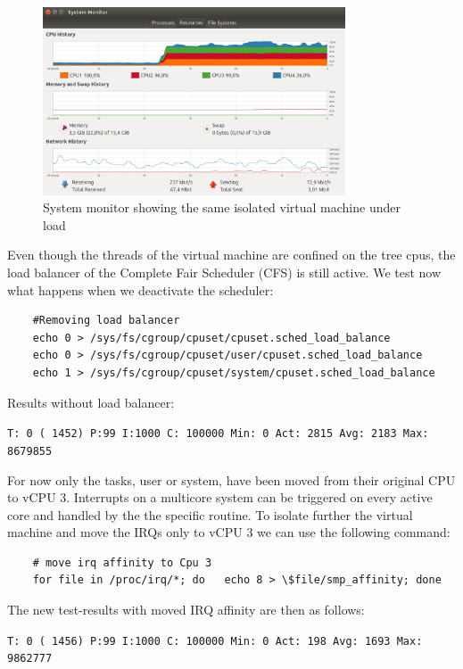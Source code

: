 \documentclass[]{scrartcl}
\begin{document}
\begin{figure}[t]
	\centering
	\includegraphics[width=0.8\textwidth]{test-cpuload}
	\caption{System monitor showing the same isolated virtual machine under load}
	\label{fig:test-cpuload}
\end{figure}

Even though the threads of the virtual machine are confined on the tree cpus, the load balancer of the Complete Fair Scheduler (CFS) is still active. We test now what happens when we deactivate the scheduler:

\begin{verbatim}
	#Removing load balancer
	echo 0 > /sys/fs/cgroup/cpuset/cpuset.sched_load_balance
	echo 0 > /sys/fs/cgroup/cpuset/user/cpuset.sched_load_balance
	echo 1 > /sys/fs/cgroup/cpuset/system/cpuset.sched_load_balance
\end{verbatim}

\noindent Results without load balancer:

\noindent  \texttt{T: 0 ( 1452) P:99 I:1000 C: 100000 Min:      0 Act: 2815 Avg: 2183 Max:  8679855}

For now only the tasks, user or system, have been moved from their original CPU to vCPU 3. Interrupts on a multicore system can be triggered on every active core and handled by the the specific routine. To isolate further the virtual machine and move the IRQs only to vCPU 3 we can use the following command: 

\begin{verbatim}
	# move irq affinity to Cpu 3
	for file in /proc/irq/*; do   echo 8 > \$file/smp_affinity; done
\end{verbatim}

\noindent The new test-results with moved IRQ affinity are then as follows:

\noindent \texttt{T: 0 ( 1456) P:99 I:1000 C: 100000 Min:      0 Act:  198 Avg: 1693 Max:  9862777}
\end{document}
